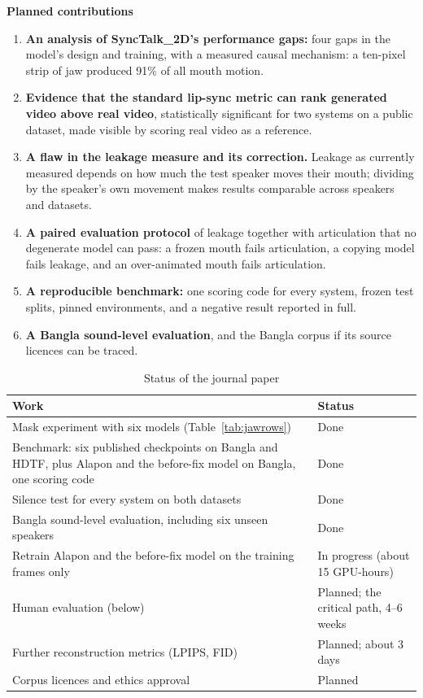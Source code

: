 \noindent
\textbf{Planned contributions}

\begin{enumerate}
    \item \textbf{An analysis of SyncTalk\_2D's performance gaps:} four gaps in the model's design and training, with a measured causal mechanism: a ten-pixel strip of jaw produced 91\% of all mouth motion.
    \item \textbf{Evidence that the standard lip-sync metric can rank generated video above real video}, statistically significant for two systems on a public dataset, made visible by scoring real video as a reference.
    \item \textbf{A flaw in the leakage measure and its correction.} Leakage as currently measured depends on how much the test speaker moves their mouth; dividing by the speaker's own movement makes results comparable across speakers and datasets.
    \item \textbf{A paired evaluation protocol} of leakage together with articulation that no degenerate model can pass: a frozen mouth fails articulation, a copying model fails leakage, and an over-animated mouth fails articulation.
    \item \textbf{A reproducible benchmark:} one scoring code for every system, frozen test splits, pinned environments, and a negative result reported in full.
    \item \textbf{A Bangla sound-level evaluation}, and the Bangla corpus if its source licences can be traced.
\end{enumerate}

\begin{table}[H]
\centering
\caption{Status of the journal paper}
\label{tab:journal}
\renewcommand{\arraystretch}{1.3}
\begin{tabular}{|p{8.6cm}|p{4.9cm}|}
\hline
\textbf{Work} & \textbf{Status} \\
\hline
Mask experiment with six models (Table~\ref{tab:jawrows}) & Done \\
\hline
Benchmark: six published checkpoints on Bangla and HDTF, plus Alapon and the before-fix model on Bangla, one scoring code & Done \\
\hline
Silence test for every system on both datasets & Done \\
\hline
Bangla sound-level evaluation, including six unseen speakers & Done \\
\hline
Retrain Alapon and the before-fix model on the training frames only & In progress (about 15 GPU-hours) \\
\hline
Human evaluation (below) & Planned; the critical path, 4--6 weeks \\
\hline
Further reconstruction metrics (LPIPS, FID) & Planned; about 3 days \\
\hline
Corpus licences and ethics approval & Planned \\
\hline
\end{tabular}
\end{table}

